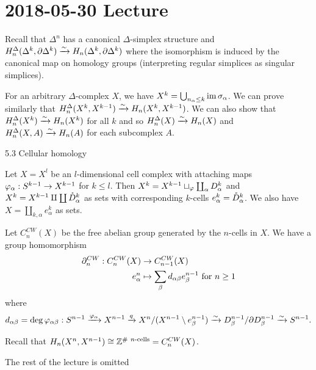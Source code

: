 \section{2018-05-30 Lecture}

Recall that $\Delta^n$ has a canonical $\Delta$-simplex structure and $H_n^\Delta(\Delta^k,\partial\Delta^k) \xrightarrow{\sim} H_n(\Delta^k,\partial\Delta^k)$ where the isomorphism is induced by the canonical map on homology groups (interpreting regular simplices as singular simplices).

For an arbitrary $\Delta$-complex $X$, we have $X^k = \bigcup_{n_\alpha \leq k} \operatorname{im}\sigma_\alpha$.
We can prove similarly that $H_n^\Delta(X^k,X^{k-1}) \xrightarrow{\sim} H_n(X^k,X^{k-1})$.
We can also show that $H_n^\Delta(X^k) \xrightarrow{\sim} H_n(X^k)$ for all $k$ and so $H_n^\Delta(X) \xrightarrow{\sim} H_n(X)$ and $H_n^\Delta(X,A) \xrightarrow{\sim} H_n(A)$ for each subcomplex $A$.

5.3 Cellular homology

Let $X=X^l$ be an $l$-dimensional cell complex with attaching maps $\varphi_\alpha: S^{k-1} \to X^{k-1}$ for $k \leq l$.
Then $X^k = X^{k-1} \sqcup_\varphi \coprod_\alpha D_\alpha^k$ and $X^k = X^{k-1} \amalg \coprod \mathring D_\alpha^k$ as sets with corresponding $k$-cells $e_\alpha^k = \mathring D_\alpha^k$.
We also have $X = \amalg_{k,\alpha} e_\alpha^k$ as sets.

\begin{defn}
  Let $C_n^{CW}(X)$ be the free abelian group generated by the $n$-cells in $X$.
  We have a group homomorphism
  \begin{align*}
    \partial_n^{CW}: C_n^{CW}(X) &\to C_{n-1}^{CW}(X) \\
    e_\alpha^n &\mapsto \sum_\beta d_{\alpha\beta}e_\beta^{n-1} \text{ for } n \geq 1
  \end{align*}
  where
  \[ d_{\alpha\beta} = \deg\varphi_{\alpha\beta}: S^{n-1} \xrightarrow{\varphi_\alpha} X^{n-1} \xrightarrow{q} X^n/(X^{n-1} \setminus e_\beta^{n-1}) \xrightarrow{\sim} D_\beta^{n-1}/\partial D_\beta^{n-1} \xrightarrow{\sim} S^{n-1}. \]
\end{defn}

Recall that $H_n(X^n,X^{n-1}) \cong \mathbb{Z}^{\#\ n\text{-cells}} = C_n^{CW}(X)$.

The rest of the lecture is omitted
